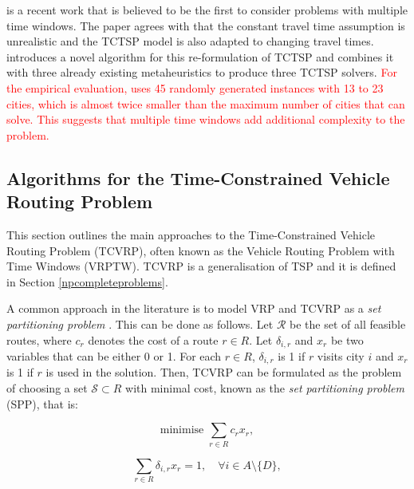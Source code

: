 \documentclass{mprop}
\theoremstyle{definition}
\begin{document}
\citet{Hurkala15} is a recent work that is believed to be the first to consider problems with multiple time windows. The paper agrees with \citet{ariglianotime} that the constant travel time assumption is unrealistic and the TCTSP model is also adapted to changing travel times. \citet{Hurkala15} introduces a novel algorithm for this re-formulation of TCTSP and combines it with three already existing metaheuristics to produce three TCTSP solvers. \textcolor{red}{For the empirical evaluation, \citet{Hurkala15} uses 45 randomly generated instances with 13 to 23 cities, which is almost twice smaller than the maximum number of cities that \citet{ariglianotime} can solve. This suggests that multiple time windows add additional complexity to the problem.} %

\subsection{Algorithms for the Time-Constrained Vehicle Routing Problem}
\label{sec:tcvrpalgos}
This section outlines the main approaches to the Time-Constrained Vehicle Routing Problem (TCVRP), often known as the Vehicle Routing Problem with Time Windows (VRPTW). TCVRP is a generalisation of TSP and it is defined in Section \ref{npcompleteproblems}.

A common approach in the literature is to model VRP and TCVRP as a \textit{set partitioning problem} \citep{Desrochers92,Agarwal89,Desrosiers84,Alvarenga07}. This can be done as follows. Let $\mathcal{R}$ be the set of all feasible routes, where $c_{r}$ denotes the cost of a route $r \in R$. Let $\delta_{i,r}$ and $x_{r}$ be two variables that can be either 0 or 1. For each $r \in R$, $\delta_{i,r}$ is 1 if $r$ visits city $i$ and $x_{r}$ is 1 if $r$ is used in the solution. Then, TCVRP can be formulated as the problem of choosing a set $\mathcal{S} \subset R$ with minimal cost, known as the \textit{set partitioning problem} (SPP), that is:

\begin{equation}
\label{eq:tcvrpobjfunc}
\textrm{minimise } \sum_{r \in R} c_{r} x_{r},
\end{equation}

\begin{equation}
\label{eq:tcvrpconstraint1}
\sum_{r \in R} \delta_{i,r} x_{r} = 1, \quad \forall i \in A \setminus \{D\},
\end{equation}
\end{document}
